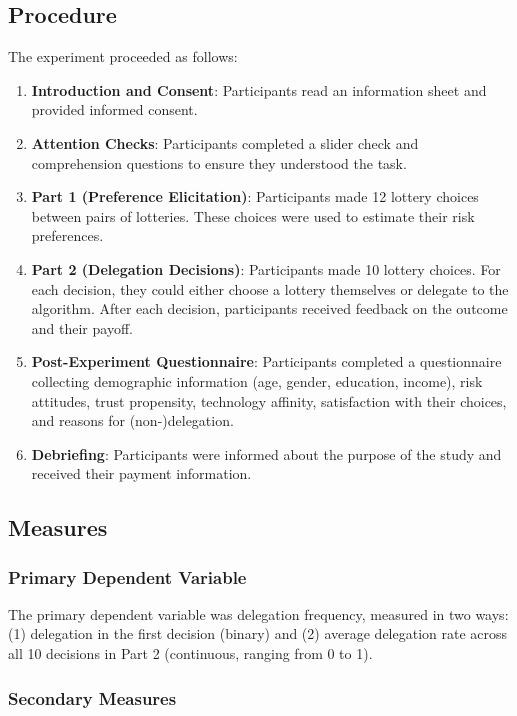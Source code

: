 \subsection{Procedure}

The experiment proceeded as follows:

\begin{enumerate}
    \item \textbf{Introduction and Consent}: Participants read an information sheet and provided informed consent.
    \item \textbf{Attention Checks}: Participants completed a slider check and comprehension questions to ensure they understood the task.
    \item \textbf{Part 1 (Preference Elicitation)}: Participants made 12 lottery choices between pairs of lotteries. These choices were used to estimate their risk preferences.
    \item \textbf{Part 2 (Delegation Decisions)}: Participants made 10 lottery choices. For each decision, they could either choose a lottery themselves or delegate to the algorithm. After each decision, participants received feedback on the outcome and their payoff.
    \item \textbf{Post-Experiment Questionnaire}: Participants completed a questionnaire collecting demographic information (age, gender, education, income), risk attitudes, trust propensity, technology affinity, satisfaction with their choices, and reasons for (non-)delegation.
    \item \textbf{Debriefing}: Participants were informed about the purpose of the study and received their payment information.
\end{enumerate}

\subsection{Measures}

\subsubsection{Primary Dependent Variable}

The primary dependent variable was delegation frequency, measured in two ways: (1) delegation in the first decision (binary) and (2) average delegation rate across all 10 decisions in Part 2 (continuous, ranging from 0 to 1).

\subsubsection{Secondary Measures}

